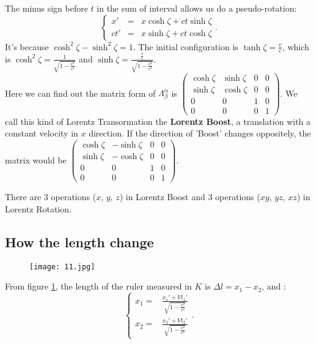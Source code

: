 \documentclass[openany,10pt]{book}
\theoremstyle{definition}
\theoremstyle{definition}
\theoremstyle{remark}
\begin{document}
The minus sign before $t$ in the sum of interval allows us do a pseudo-rotation:
\begin{equation}
\left\{
\begin{aligned}
x' & = & x \cosh{\zeta}+ct\sinh{\zeta} \\
ct' & = & x \sinh{\zeta}+ct\cosh{\zeta}  
\end{aligned}.
\right.
\end{equation}
It's because $\cosh^2{\zeta}-\sinh^2{\zeta}=1$. The 
initial configuration is $\tanh{\zeta}=\frac{v}{c}$, which is $\cosh^2{\zeta}=\frac{1}{\sqrt{1-\frac{v^2}{c^2}}}$ and $\sinh{\zeta}=\frac{\frac{v}{c}}{\sqrt{1-\frac{v^2}{c^2}}}$.\\
Here we can find out the matrix form of $\Lambda^\alpha_\beta$ is $\begin{pmatrix}
   \cosh{\zeta}& \sinh{\zeta} & 0 & 0\\
   \sinh{\zeta} & \cosh{\zeta} & 0 & 0\\
   0 & 0 & 1 & 0\\
   0 &0 & 0& 1
  \end{pmatrix}$. 
  We call this kind of Lorentz Transormation the {\bfseries Lorentz Boost}, a translation with a constant velocity in $x$ direction. If the direction of 'Boost' changes oppositely, the matrix would be $\begin{pmatrix}
   \cosh{\zeta}& -\sinh{\zeta} & 0 & 0\\
   \sinh{\zeta} & -\cosh{\zeta} & 0 & 0\\
   0 & 0 & 1 & 0\\
   0 &0 & 0& 1
  \end{pmatrix}$. 
  
   There are 3 operations ($x$, $y$, $z$) in Lorentz Boost and 3 operations ($xy$, $yz$, $xz$) in Lorentz Rotation.


\subsection{How the length change}


\begin{figure}[htbp]
  \centering
    \texttt{[image: 11.jpg]}
    \caption{}\label{length}
\end{figure}


From figure \ref{length}, the length of the ruler measured in $K$ is $\Delta l=x_1-x_2$, and :
\begin{equation}
\left\{
\begin{aligned}
x_1=&\frac{x_1'+Vt_1'}{\sqrt{1-\frac{v^2}{c^2}}}\\
x_2=&\frac{x_2'+Vt_2'}{\sqrt{1-\frac{v^2}{c^2}}}
\end{aligned}.
\right.
\end{equation}
\end{document}
